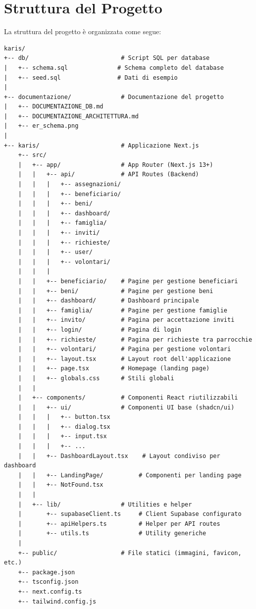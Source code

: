 \documentclass{article}
\begin{document}
\section{Struttura del Progetto}

La struttura del progetto è organizzata come segue:

\begin{verbatim}
karis/
+-- db/                          # Script SQL per database
|   +-- schema.sql              # Schema completo del database
|   +-- seed.sql                # Dati di esempio
|
+-- documentazione/              # Documentazione del progetto
|   +-- DOCUMENTAZIONE_DB.md
|   +-- DOCUMENTAZIONE_ARCHITETTURA.md
|   +-- er_schema.png
|
+-- karis/                       # Applicazione Next.js
    +-- src/
    |   +-- app/                 # App Router (Next.js 13+)
    |   |   +-- api/             # API Routes (Backend)
    |   |   |   +-- assegnazioni/
    |   |   |   +-- beneficiario/
    |   |   |   +-- beni/
    |   |   |   +-- dashboard/
    |   |   |   +-- famiglia/
    |   |   |   +-- inviti/
    |   |   |   +-- richieste/
    |   |   |   +-- user/
    |   |   |   +-- volontari/
    |   |   |
    |   |   +-- beneficiario/    # Pagine per gestione beneficiari
    |   |   +-- beni/            # Pagine per gestione beni
    |   |   +-- dashboard/       # Dashboard principale
    |   |   +-- famiglia/        # Pagine per gestione famiglie
    |   |   +-- invito/          # Pagina per accettazione inviti
    |   |   +-- login/           # Pagina di login
    |   |   +-- richieste/       # Pagina per richieste tra parrocchie
    |   |   +-- volontari/       # Pagina per gestione volontari
    |   |   +-- layout.tsx       # Layout root dell'applicazione
    |   |   +-- page.tsx         # Homepage (landing page)
    |   |   +-- globals.css      # Stili globali
    |   |
    |   +-- components/          # Componenti React riutilizzabili
    |   |   +-- ui/              # Componenti UI base (shadcn/ui)
    |   |   |   +-- button.tsx
    |   |   |   +-- dialog.tsx
    |   |   |   +-- input.tsx
    |   |   |   +-- ...
    |   |   +-- DashboardLayout.tsx    # Layout condiviso per dashboard
    |   |   +-- LandingPage/          # Componenti per landing page
    |   |   +-- NotFound.tsx
    |   |
    |   +-- lib/                 # Utilities e helper
    |       +-- supabaseClient.ts     # Client Supabase configurato
    |       +-- apiHelpers.ts         # Helper per API routes
    |       +-- utils.ts              # Utility generiche
    |
    +-- public/                  # File statici (immagini, favicon, etc.)
    +-- package.json
    +-- tsconfig.json
    +-- next.config.ts
    +-- tailwind.config.js
\end{verbatim}
\end{document}
